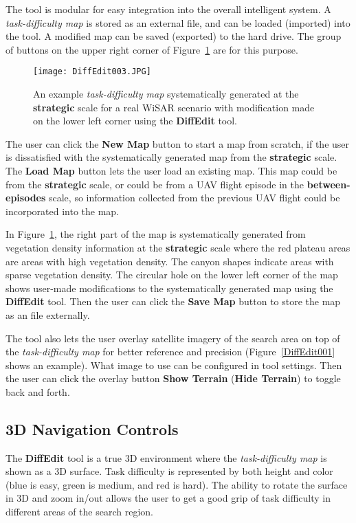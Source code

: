 The tool is modular for easy integration into the overall intelligent system. A \textit{task-difficulty map} is stored as an external file, and can be loaded (imported) into the tool. A modified map can be saved (exported) to the hard drive. The group of buttons on the upper right corner of Figure~\ref{DiffEdit003} are for this purpose.

\begin{figure}
\centering
\texttt{[image: DiffEdit003.JPG]}
\caption{An example \textit{task-difficulty map} systematically generated at the \textbf{strategic} scale for a real WiSAR scenario with modification made on the lower left corner using the \textbf{DiffEdit} tool.}
\label{DiffEdit003}
\end{figure}

The user can click the \textbf{New Map} button to start a map from scratch, if the user is dissatisfied with the systematically generated map from the \textbf{strategic} scale. The \textbf{Load Map} button lets the user load an existing map. This map could be from the \textbf{strategic} scale, or could be from a UAV flight episode in the \textbf{between-episodes} scale, so information collected from the previous UAV flight could be incorporated into the map. 

In Figure~\ref{DiffEdit003}, the right part of the map is systematically generated from vegetation density information at the \textbf{strategic} scale where the red plateau areas are areas with high vegetation density. The canyon shapes indicate areas with sparse vegetation density. The circular hole on the lower left corner of the map shows user-made modifications to the systematically generated map using the \textbf{DiffEdit} tool. Then the user can click the \textbf{Save Map} button to store the map as an file externally.

The tool also lets the user overlay satellite imagery of the search area on top of the \textit{task-difficulty map} for better reference and precision (Figure~\ref{DiffEdit001} shows an example). What image to use can be configured in tool settings. Then the user can click the overlay button \textbf{Show Terrain} (\textbf{Hide Terrain}) to toggle back and forth.

\subsection{3D Navigation Controls}

The \textbf{DiffEdit} tool is a true 3D environment where the \textit{task-difficulty map} is shown as a 3D surface. Task difficulty is represented by both height and color (blue is easy, green is medium, and red is hard). The ability to rotate the surface in 3D and zoom in/out allows the user to get a good grip of task difficulty in different areas of the search region.

